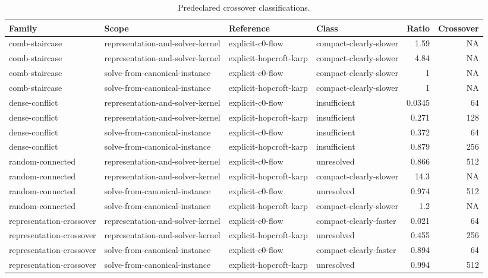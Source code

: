 \begin{table}[t]
\caption{Predeclared crossover classifications.}
\label{tab:kernel-crossover}
\begin{tabular}{llllrr}
\toprule
Family & Scope & Reference & Class & Ratio & Crossover \\
\midrule
comb-staircase & representation-and-solver-kernel & explicit-c0-flow & compact-clearly-slower & 1.59 & NA \\
comb-staircase & representation-and-solver-kernel & explicit-hopcroft-karp & compact-clearly-slower & 4.84 & NA \\
comb-staircase & solve-from-canonical-instance & explicit-c0-flow & compact-clearly-slower & 1 & NA \\
comb-staircase & solve-from-canonical-instance & explicit-hopcroft-karp & compact-clearly-slower & 1 & NA \\
dense-conflict & representation-and-solver-kernel & explicit-c0-flow & insufficient & 0.0345 & 64 \\
dense-conflict & representation-and-solver-kernel & explicit-hopcroft-karp & insufficient & 0.271 & 128 \\
dense-conflict & solve-from-canonical-instance & explicit-c0-flow & insufficient & 0.372 & 64 \\
dense-conflict & solve-from-canonical-instance & explicit-hopcroft-karp & insufficient & 0.879 & 256 \\
random-connected & representation-and-solver-kernel & explicit-c0-flow & unresolved & 0.866 & 512 \\
random-connected & representation-and-solver-kernel & explicit-hopcroft-karp & compact-clearly-slower & 14.3 & NA \\
random-connected & solve-from-canonical-instance & explicit-c0-flow & unresolved & 0.974 & 512 \\
random-connected & solve-from-canonical-instance & explicit-hopcroft-karp & compact-clearly-slower & 1.2 & NA \\
representation-crossover & representation-and-solver-kernel & explicit-c0-flow & compact-clearly-faster & 0.021 & 64 \\
representation-crossover & representation-and-solver-kernel & explicit-hopcroft-karp & unresolved & 0.455 & 256 \\
representation-crossover & solve-from-canonical-instance & explicit-c0-flow & compact-clearly-faster & 0.894 & 64 \\
representation-crossover & solve-from-canonical-instance & explicit-hopcroft-karp & unresolved & 0.994 & 512 \\

\end{tabular}
\end{table}
